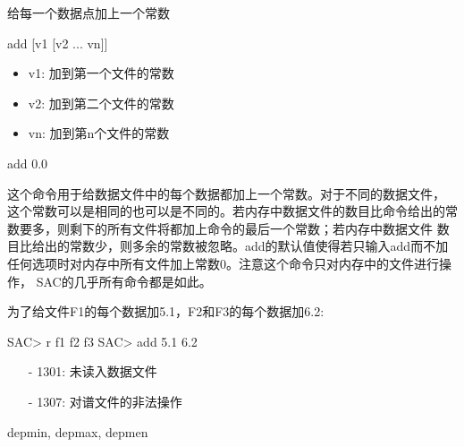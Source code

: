 \label{cmd:add}

给每一个数据点加上一个常数

\begin{SACSTX}
add [v1 [v2 ... vn]]
\end{SACSTX}

\begin{itemize}
\item v1:  加到第一个文件的常数
\item v2:  加到第二个文件的常数
\item vn:  加到第n个文件的常数
\end{itemize}

\begin{SACDFT}
add 0.0
\end{SACDFT}

这个命令用于给数据文件中的每个数据都加上一个常数。对于不同的数据文件，
这个常数可以是相同的也可以是不同的。若内存中数据文件的数目比命令给出的常
数要多，则剩下的所有文件将都加上命令的最后一个常数；若内存中数据文件
数目比给出的常数少，则多余的常数被忽略。add的默认值使得若只输入add而不加
任何选项时对内存中所有文件加上常数0。注意这个命令只对内存中的文件进行操作，
SAC的几乎所有命令都是如此。

为了给文件F1的每个数据加5.1，F2和F3的每个数据加6.2:
\begin{SACCode}
SAC> r f1 f2 f3
SAC> add 5.1 6.2
\end{SACCode}

\begin{itemize}
\item[-]1301: 未读入数据文件
\item[-]1307: 对谱文件的非法操作
\end{itemize}

depmin, depmax, depmen
